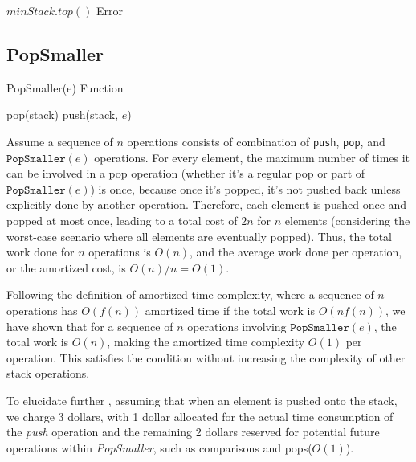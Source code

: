 \documentclass[12pt]{article}
\begin{document}
\begin{algorithm*}
    \begin{algorithmic}[1]
            \State \Return $minStack.top()$
        \Else
            \State \Return Error 
        \EndIf
    \EndFunction
    \end{algorithmic}
\end{algorithm*}

\newpage

\subsection*{PopSmaller}   

\begin{algorithm}
    \caption{PopSmaller(e) Function}
    \begin{algorithmic}[1]
            \State pop(stack)
        \EndWhile
        \State push(stack, $e$)
    \EndFunction
    \end{algorithmic}
\end{algorithm}

Assume a sequence of $n$ operations consists of combination of 
\texttt{push}, \texttt{pop}, and $\texttt{PopSmaller}(e)$ operations. 
For every element, the maximum number of times it can be involved 
in a pop operation (whether it's a regular pop or part of 
$\texttt{PopSmaller}(e)$) is once, because once it's popped, it's 
not pushed back unless explicitly done by another operation. 
Therefore, each element is pushed once and popped at most once, 
leading to a total cost of $2n$ for $n$ elements 
(considering the worst-case scenario where all elements are 
eventually popped). Thus, the total work done for $n$ operations 
is $O(n)$, and the average work done per operation, or the 
amortized cost, is $O(n) / n = O(1)$.


Following the definition of amortized time complexity, where a 
sequence of $n$ operations has $O(f(n))$ amortized time if the total 
work is $O(nf(n))$, we have shown that for a sequence of $n$ operations 
involving $\texttt{PopSmaller}(e)$, the total work is $O(n)$, making 
the amortized time complexity $O(1)$ per operation. This satisfies 
the condition without increasing the complexity of other stack 
operations.

To elucidate further , 
assuming that when an element is pushed onto the stack, 
we charge 3 dollars, with 1 dollar allocated for the actual 
time consumption of the \textit{push} operation and the 
remaining 2 dollars reserved for potential future operations 
within \textit{PopSmaller}, such as comparisons and pops($O(1)$).
\end{document}
